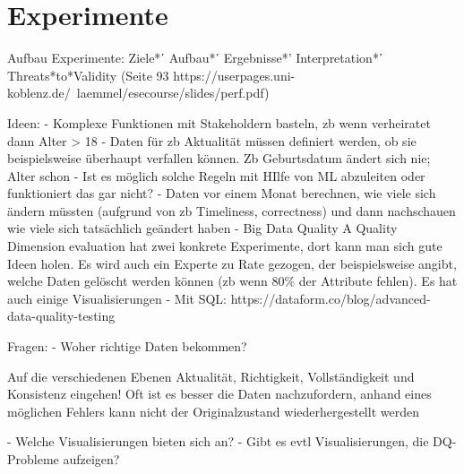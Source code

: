 \chapter{Experimente}\label{ch:experiments}

Aufbau Experimente: 
Ziele*ʹ Aufbau*ʹ Ergebnisse*' Interpretation*ʹ Threats*to*Validity
(Seite 93 https://userpages.uni-koblenz.de/~laemmel/esecourse/slides/perf.pdf)


Ideen:
- Komplexe Funktionen mit Stakeholdern basteln, zb wenn verheiratet dann Alter > 18
- Daten für zb Aktualität müssen definiert werden, ob sie beispielsweise überhaupt verfallen können. Zb Geburtsdatum ändert sich nie; Alter schon
- Ist es möglich solche Regeln mit HIlfe von ML abzuleiten oder funktioniert das gar nicht? 
- Daten vor einem Monat berechnen, wie viele sich ändern müssten (aufgrund von zb Timeliness, correctness) und dann nachschauen wie viele sich tatsächlich geändert haben
- Big Data Quality A Quality Dimension evaluation hat zwei konkrete Experimente, dort kann man sich gute Ideen holen. Es wird auch ein Experte zu Rate gezogen, der beispielsweise angibt, welche Daten gelöscht werden können (zb wenn 80\% der Attribute fehlen). Es hat auch einige Visualisierungen 
- Mit SQL: 
https://dataform.co/blog/advanced-data-quality-testing

Fragen:
- Woher richtige Daten bekommen?


Auf die verschiedenen Ebenen Aktualität, Richtigkeit, Vollständigkeit und Konsistenz eingehen!
Oft ist es besser die Daten nachzufordern, anhand eines möglichen Fehlers kann nicht der Originalzustand wiederhergestellt werden


- Welche Visualisierungen bieten sich an?
- Gibt es evtl Visualisierungen, die DQ-Probleme aufzeigen?
